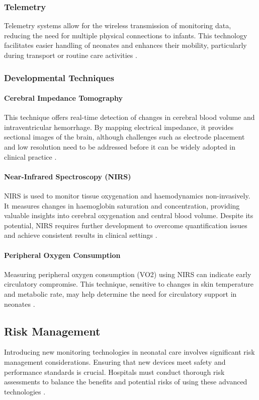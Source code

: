\documentclass[12pt,journal,compsoc]{IEEEtran}
\begin{document}
\subsubsection{Telemetry}
Telemetry systems allow for the wireless transmission of monitoring data, reducing the need for multiple physical connections to infants. This technology facilitates easier handling of neonates and enhances their mobility, particularly during transport or routine care activities \cite{IEEEhowto:nicklin}.

\subsubsection{Developmental Techniques}

\paragraph{Cerebral Impedance Tomography}
This technique offers real-time detection of changes in cerebral blood volume and intraventricular hemorrhage. By mapping electrical impedance, it provides sectional images of the brain, although challenges such as electrode placement and low resolution need to be addressed before it can be widely adopted in clinical practice \cite{IEEEhowto:nicklin}.

\paragraph{Near-Infrared Spectroscopy (NIRS)}
NIRS is used to monitor tissue oxygenation and haemodynamics non-invasively. It measures changes in haemoglobin saturation and concentration, providing valuable insights into cerebral oxygenation and central blood volume. Despite its potential, NIRS requires further development to overcome quantification issues and achieve consistent results in clinical settings \cite{IEEEhowto:nicklin}.

\paragraph{Peripheral Oxygen Consumption}
Measuring peripheral oxygen consumption (VO2) using NIRS can indicate early circulatory compromise. This technique, sensitive to changes in skin temperature and metabolic rate, may help determine the need for circulatory support in neonates \cite{IEEEhowto:nicklin}.

\subsection{Risk Management}
Introducing new monitoring technologies in neonatal care involves significant risk management considerations. Ensuring that new devices meet safety and performance standards is crucial. Hospitals must conduct thorough risk assessments to balance the benefits and potential risks of using these advanced technologies \cite{IEEEhowto:nicklin}.
\end{document}

